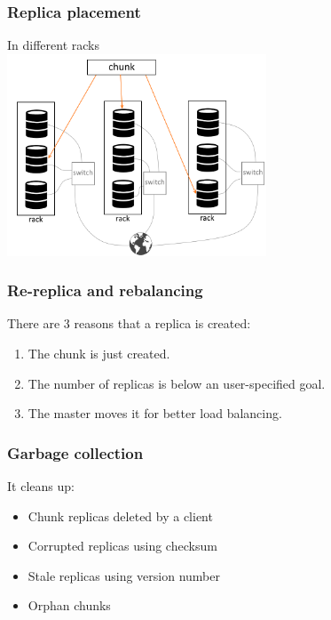 \documentclass{beamer}
\begin{document}
\begin{frame}
 \frametitle{Replica placement}
 In different racks\\\vspace{0.3cm}
 \centering
 \includegraphics[height=6cm]{figures/racksschema.png}
\end{frame}

\begin{frame}
 \frametitle{Re-replica and rebalancing}
 There are 3 reasons that a replica is created:
 \begin{enumerate}
  \item The chunk is just created.
  \item The number of replicas is below an user-specified goal.
  \item The master moves it for better load balancing.
 \end{enumerate}
\end{frame}

\begin{frame}
 \frametitle{Garbage collection}
 It cleans up:
 \begin{itemize}
  \item Chunk replicas deleted by a client
  \item Corrupted replicas using checksum
  \item Stale replicas using version number
  \item Orphan chunks
 \end{itemize}
\end{frame}
\end{document}
